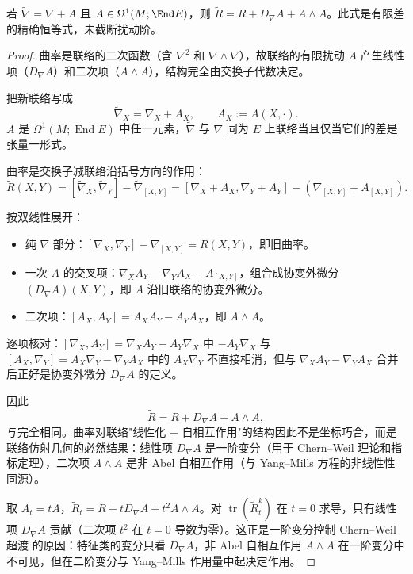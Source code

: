 \begin{proposition}[曲率的有限扰动]
若 $\widetilde\nabla=\nabla+A$ 且 $A\in\Omega^1(M;\End E)$，则 $\widetilde R=R+D_\nabla A+A\wedge A$。此式是有限差的精确恒等式，未截断扰动阶。
\end{proposition}
\begin{proof}
曲率是联络的二次函数（含 $\nabla^2$ 和 $\nabla\wedge\nabla$），故联络的有限扰动 $A$ 产生线性项（$D_\nabla A$）和二次项（$A\wedge A$），结构完全由交换子代数决定。

把新联络写成
\begin{equation*}
 \widetilde\nabla_X=\nabla_X+A_X,
 \qquad
 A_X:=A(X,\cdot).
\end{equation*}
$A$ 是 $\Omega^1(M;\operatorname{End}E)$ 中任一元素，$\widetilde\nabla$ 与 $\nabla$ 同为 $E$ 上联络当且仅当它们的差是张量一形式。

曲率是交换子减联络沿括号方向的作用：
\begin{equation*}
 \widetilde R(X,Y)
 =[\widetilde\nabla_X,\widetilde\nabla_Y]-\widetilde\nabla_{[X,Y]}
 =[\nabla_X+A_X,\nabla_Y+A_Y]
 -(\nabla_{[X,Y]}+A_{[X,Y]}).
\end{equation*}

按双线性展开：
\begin{itemize}
\item 纯 $\nabla$ 部分：$[\nabla_X,\nabla_Y]-\nabla_{[X,Y]}=R(X,Y)$，即旧曲率。
\item 一次 $A$ 的交叉项：$\nabla_XA_Y-\nabla_YA_X-A_{[X,Y]}$，组合成协变外微分 $(D_\nabla A)(X,Y)$，即 $A$ 沿旧联络的协变外微分。
\item 二次项：$[A_X,A_Y]=A_XA_Y-A_YA_X$，即 $A\wedge A$。
\end{itemize}
逐项核对：$[\nabla_X,A_Y]=\nabla_XA_Y-A_Y\nabla_X$ 中 $-A_Y\nabla_X$ 与 $[A_X,\nabla_Y]=A_X\nabla_Y-\nabla_YA_X$ 中的 $A_X\nabla_Y$ 不直接相消，但与 $\nabla_XA_Y-\nabla_YA_X$ 合并后正好是协变外微分 $D_\nabla A$ 的定义。

因此
\begin{equation*}
 \widetilde R=R+D_\nabla A+A\wedge A,
\end{equation*}
与完全相同。曲率对联络"线性化 + 自相互作用"的结构因此不是坐标巧合，而是联络仿射几何的必然结果：线性项 $D_\nabla A$ 是一阶变分（用于 Chern--Weil 理论和指标定理），二次项 $A\wedge A$ 是非 Abel 自相互作用（与 Yang--Mills 方程的非线性性同源）。

取 $A_t=tA$，$\widetilde R_t=R+tD_\nabla A+t^2 A\wedge A$。对 $\operatorname{tr}(\widetilde R_t^k)$ 在 $t=0$ 求导，只有线性项 $D_\nabla A$ 贡献（二次项 $t^2$ 在 $t=0$ 导数为零）。这正是一阶变分控制 Chern--Weil 超渡 的原因：特征类的变分只看 $D_\nabla A$，非 Abel 自相互作用 $A\wedge A$ 在一阶变分中不可见，但在二阶变分与 Yang--Mills 作用量中起决定作用。


\end{proof}
